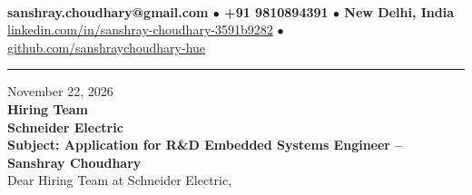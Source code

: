 \documentclass[10pt,a4paper]{article}%
\begin{document}
%
 \vspace{3pt}\\%
\noindent \textbf{\footnotesize sanshray.choudhary@gmail.com $\bullet$ +91 9810894391 $\bullet$ New Delhi, India}\\%
\noindent \href{https://www.linkedin.com/in/sanshray-choudhary-3591b9282}{linkedin.com/in/sanshray-choudhary-3591b9282} $\bullet$ \href{https://github.com/sanshraychoudhary-hue}{github.com/sanshraychoudhary-hue} \vspace{12pt}%
\hrule \vspace{18pt}%

\noindent November 22, 2026 \vspace{12pt}\\%
\noindent \textbf{Hiring Team} \\%
\noindent \textbf{Schneider Electric} \vspace{16pt}\\%

\noindent \textbf{Subject: Application for R\&D Embedded Systems Engineer -- Sanshray Choudhary} \vspace{12pt}\\%

\noindent Dear Hiring Team at Schneider Electric, \vspace{8pt}\\%
\end{document}
